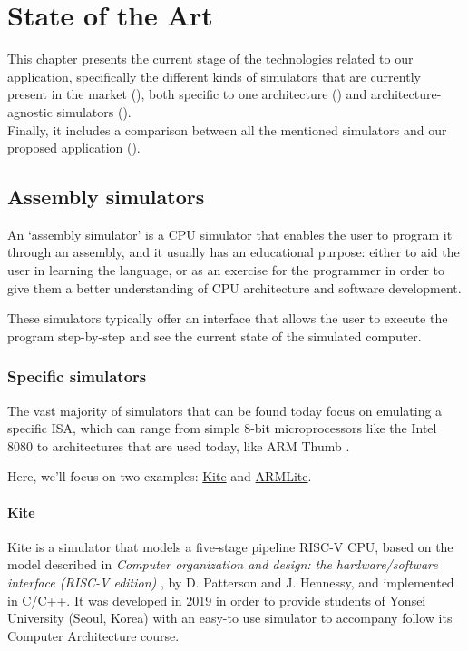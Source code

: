 \chapter{State of the Art}\label{chap:state-of-the-art}
This chapter presents the current stage of the technologies related to our application, specifically the different kinds of simulators that are currently present in the market (), both specific to one architecture () and architecture-agnostic simulators ().\\
Finally, it includes a comparison between all the mentioned simulators and our proposed application ().



\section{Assembly simulators}\label{sec:assembly-simulators}
An `\gls{assembly simulator}' is a CPU simulator that enables the user to program it through an \gls{assembly}, and it usually has an educational purpose: either to aid the user in learning the language, or as an exercise for the programmer in order to give them a better understanding of CPU architecture and software development.

These simulators typically offer an interface that allows the user to execute the program step-by-step and see the current state of the simulated \gls{computer}.


\subsection{Specific simulators}\label{subsec:specific-assembly-simulators}
The vast majority of simulators that can be found today focus on emulating a specific \gls{ISA}, which can range from simple 8-bit microprocessors like the Intel 8080 \parencite{i8080emulator} to architectures that are used today, like \gls{ARM} Thumb \parencite{QtARMSim}.

\noindent
Here, we'll focus on two examples: \hyperref[subsubsec:kite]{Kite} and \hyperref[subsubsec:armlite]{ARMLite}.


\subsubsection*{Kite}\label{subsubsec:kite}
Kite \parencite{song_kite2019} is a simulator that models a five-stage \gls{pipeline} \gls{RISC-V} CPU, based on the model described in \textit{Computer organization and design: the hardware/software interface (RISC-V edition)} \parencite{PattersonDavidA.2018Coad}, by D. Patterson and J. Hennessy, and implemented in C/C++. It was developed in 2019 in order to provide students of Yonsei University (Seoul, Korea) with an easy-to use simulator to accompany follow its Computer Architecture course.

